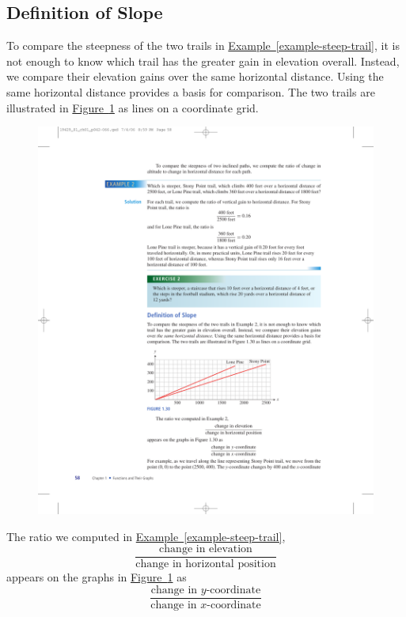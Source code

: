 \documentclass[10pt,]{book}
\theoremstyle{plain}
\theoremstyle{definition}
\theoremstyle{definition}
\theoremstyle{definition}
\theoremstyle{definition}
\numberwithin{equation}{part}
\begin{document}
\subsection[{Definition of Slope}]{Definition of Slope}\label{subsection-22}
To compare the steepness of the two trails in \hyperref[example-steep-trail]{Example~\ref{example-steep-trail}}, it is not enough to know which trail has the greater gain in elevation overall. Instead, we compare their elevation gains over the same horizontal distance. Using the same horizontal distance provides a basis for comparison. The two trails are illustrated in \hyperref[fig-trail-climb-grid]{Figure~\ref{fig-trail-climb-grid}} as lines on a coordinate grid.%
\begin{figure}
\centering
\includegraphics[width=0.9\linewidth]{images/fig-trail-climb-grid}
\caption{\label{fig-trail-climb-grid}}
\end{figure}
The ratio we computed in \hyperref[example-steep-trail]{Example~\ref{example-steep-trail}},%
\begin{equation*}
\frac{\text{change in elevation}}{\text{change in horizontal position}}
\end{equation*}
appears on the graphs in \hyperref[fig-trail-climb-grid]{Figure~\ref{fig-trail-climb-grid}} as%
\begin{equation*}
\frac{\text{change in }y\text{-coordinate}}{\text{change in }x\text{-coordinate}}
\end{equation*}
\end{document}
